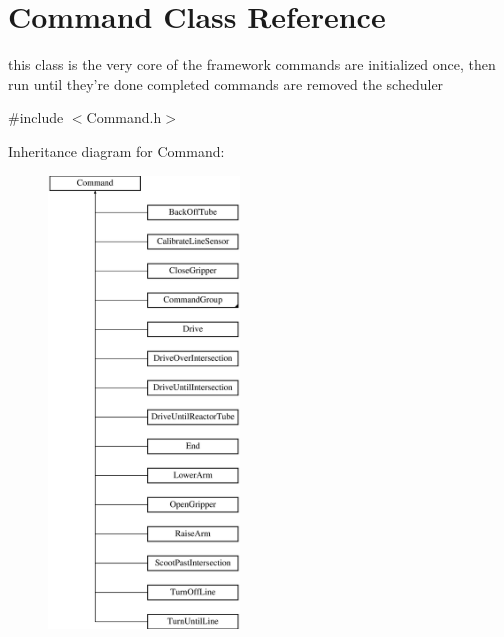 \hypertarget{classCommand}{\section{Command Class Reference}
\label{classCommand}
}


this class is the very core of the framework commands are initialized once, then run until they're done completed commands are removed the scheduler  




{\ttfamily \#include $<$Command.\-h$>$}

Inheritance diagram for Command\-:\begin{figure}[H]
\begin{center}
\leavevmode
\includegraphics[height=12.000000cm]{classCommand}
\end{center}
\end{figure}
